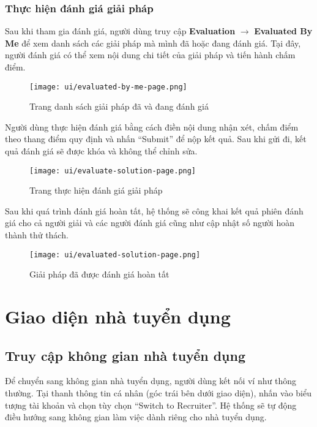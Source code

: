 \subsubsection{Thực hiện đánh giá giải pháp}

Sau khi tham gia đánh giá, người dùng truy cập \textbf{Evaluation} $\rightarrow$ \textbf{Evaluated By Me} để xem danh sách các giải pháp mà mình đã hoặc đang đánh giá.  
Tại đây, người đánh giá có thể xem nội dung chi tiết của giải pháp và tiến hành chấm điểm.

\begin{figure}[H]
  \centering
  \texttt{[image: ui/evaluated-by-me-page.png]}
  \caption{Trang danh sách giải pháp đã và đang đánh giá}
  \label{fig:evaluated-by-me-page}
\end{figure}

Người dùng thực hiện đánh giá bằng cách điền nội dung nhận xét, chấm điểm theo thang điểm quy định và nhấn ``Submit'' để nộp kết quả.  
Sau khi gửi đi, kết quả đánh giá sẽ được khóa và không thể chỉnh sửa.

\begin{figure}[H]
  \centering
  \texttt{[image: ui/evaluate-solution-page.png]}
  \caption{Trang thực hiện đánh giá giải pháp}
  \label{fig:evaluate-solution-page}
\end{figure}

Sau khi quá trình đánh giá hoàn tất, hệ thống sẽ công khai kết quả phiên đánh giá cho cả người giải và các người đánh giá cũng như cập nhật số người hoàn thành thử thách. 

\begin{figure}[H]
  \centering
  \texttt{[image: ui/evaluated-solution-page.png]}
  \caption{Giải pháp đã được đánh giá hoàn tất}
  \label{fig:evaluated-solution-page}
\end{figure}

\section{Giao diện nhà tuyển dụng}

\subsection{Truy cập không gian nhà tuyển dụng}

Để chuyển sang không gian nhà tuyển dụng, người dùng kết nối ví như thông thường.  
Tại thanh thông tin cá nhân (góc trái bên dưới giao diện), nhấn vào biểu tượng tài khoản và chọn tùy chọn ``Switch to Recruiter''.  
Hệ thống sẽ tự động điều hướng sang không gian làm việc dành riêng cho nhà tuyển dụng.

